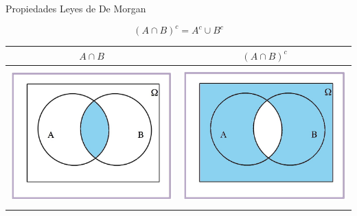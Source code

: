 \documentclass[
  ignorenonframetext,
]{beamer}
\begin{document}
\begin{frame}{Propiedades}
\protect\hypertarget{propiedades-6}{}
Leyes de De Morgan

\[(A\cap B)^c=A^c\cup B^c\]

\begin{longtable}[]{@{}cc@{}}
\toprule
\(A\cap B\) & \((A\cap B)^c\) \\
\midrule
\endhead
\includegraphics[width=\textwidth,height=2.08333in]{Images/proba1dibujos/demorgan1.jpg}
&
\includegraphics[width=\textwidth,height=2.08333in]{Images/proba1dibujos/demorgan2.jpg} \\
\bottomrule
\end{longtable}
\end{frame}
\end{document}
